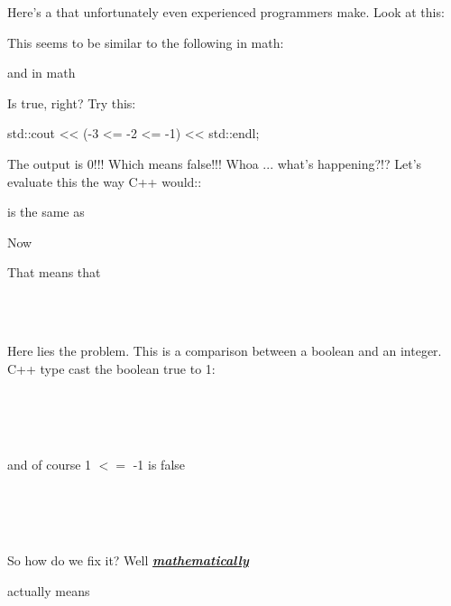 {{{{{%
Here's a  that unfortunately even experienced programmers make. Look at this:

This seems to be similar to the following in math:


and in math


Is true, right? Try this:
\begin{console}
std::cout << (-3 <= -2 <= -1) << std::endl;
\end{console}

The output is 0!!! Which means false!!! Whoa ... what's happening?!?
Let's evaluate this the way C++ would::


is the same as


Now


That means that

\\
\\

Here lies the problem. This is a comparison between a boolean and an
integer. C++ type cast the boolean true to 1:

\\
\\
\\

and of course 1 $<=$ -1 is false

\\
\\
\\

So how do we fix it? Well \underline{\textit{\textbf{mathematically}}}


actually means


}}}}}
